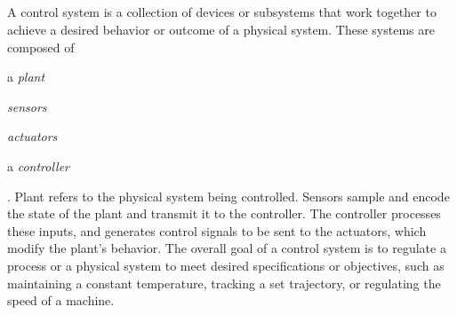 \subsection{}\label{background:ncs}


A control system is a collection of devices or subsystems that work together to achieve a desired behavior or outcome of a physical system.
These systems are composed of
\begin{inlineenum}
    \item a \emph{plant}
    \item \emph{sensors}
    \item \emph{actuators}
    \item a \emph{controller}
\end{inlineenum}.
Plant refers to the physical system being controlled.
Sensors sample and encode the state of the plant and transmit it to the controller.
The controller processes these inputs, and generates control signals to be sent to the actuators, which modify the plant's behavior.
The overall goal of a control system is to regulate a process or a physical system to meet desired specifications or objectives, such as maintaining a constant temperature, tracking a set trajectory, or regulating the speed of a machine.

